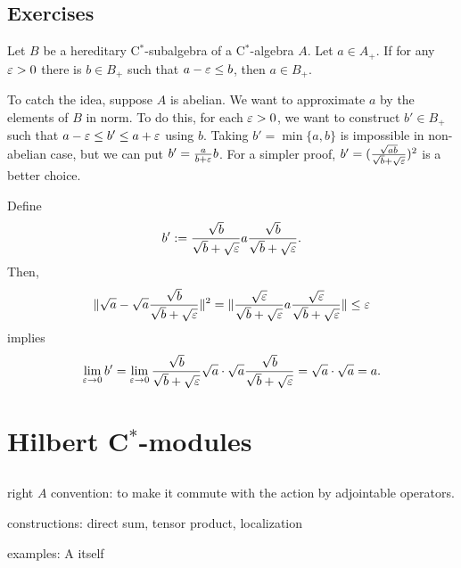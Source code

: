 \documentclass{../../large}
\begin{document}
\section*{Exercises}
\begin{prb}
Let $B$ be a hereditary C$^*$-subalgebra of a C$^*$-algebra $A$.
Let $a\in A_+$.
If for any $\varepsilon>0$ there is $b\in B_+$ such that $a-\varepsilon\le b$, then $a\in B_+$.
\end{prb}
\begin{pf}
To catch the idea, suppose $A$ is abelian.
We want to approximate $a$ by the elements of $B$ in norm.
To do this, for each $\varepsilon>0$, we want to construct $b'\in B_+$ such that $a-\varepsilon\le b'\le a+\varepsilon$ using $b$.
Taking $b'=\min\{a,b\}$ is impossible in non-abelian case, but we can put $b'=\frac a{b+\varepsilon}b$.
For a simpler proof, $b'=(\frac{\sqrt{ab}}{\sqrt b+\sqrt{\varepsilon}})^2$ is a better choice.

Define
\[b':=\frac{\sqrt b}{\sqrt b+\sqrt{\varepsilon}}a\frac{\sqrt b}{\sqrt b+\sqrt{\varepsilon}}.\]
Then,
\[\|\sqrt a-\sqrt a\frac{\sqrt b}{\sqrt b+\sqrt{\varepsilon}}\|^2=\|\frac{\sqrt{\varepsilon}}{\sqrt b+\sqrt{\varepsilon}}a\frac{\sqrt{\varepsilon}}{\sqrt b+\sqrt{\varepsilon}}\|\le\varepsilon\]
implies
\[\lim_{\varepsilon\to0}b'=\lim_{\varepsilon\to0}\frac{\sqrt b}{\sqrt b+\sqrt{\varepsilon}}\sqrt a\cdot\sqrt a\frac{\sqrt b}{\sqrt b+\sqrt{\varepsilon}}=\sqrt a\cdot\sqrt a=a.\]
\end{pf}



\chapter{Hilbert C$^*$-modules}

\section{}

right $A$ convention: to make it commute with the action by adjointable operators.

constructions:
direct sum, tensor product, localization

examples:
A itself
\end{document}
